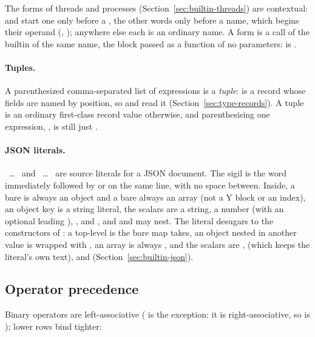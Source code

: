 The forms of threads and processes (Section~\ref{sec:builtin-threads})
are contextual:  and  start one only before a
\ic{\{}, the other words only before a name, which begins their
 operand (, 
\ic{\{ \ldots\ \}}); anywhere else each is an ordinary name. A form is a
call of the builtin of the same name, the block passed as a function of
no parameters:  is  .

\paragraph{Tuples.} A parenthesized comma-separated list of expressions is
a \emph{tuple}:  is a record whose fields are named by
position, so  and  read it (Section~\ref{sec:type-records}).
A tuple is an ordinary first-class record value otherwise, and
parenthesising one expression, , is still just .

\paragraph{JSON literals.} ~\ldots~\ic{\}} and
\ic{json[}~\ldots~\ic{]} are source literals for a JSON document. The
sigil is the word  immediately followed by \ic{\{} or \ic{[} on
the same line, with no space between. Inside, a bare \ic{\{} is always an
object and a bare \ic{[} always an array (not a Y block or an index), an
object key is a string literal, the scalars are a string, a number (with
an optional leading \ic{-}), ,  and , and
 and \ic{json[} may nest. The literal desugars to the
constructors of : a top-level  is the bare
 map  takes, an object nested in
another value is wrapped with , an array is always
, and the scalars are , 
(which keeps the literal's own text),  and 
(Section~\ref{sec:builtin-json}).

\subsection*{Operator precedence}

Binary operators are left-associative (\ic{::} is the exception: it is
right-associative, so  is ); lower rows
bind tighter:

